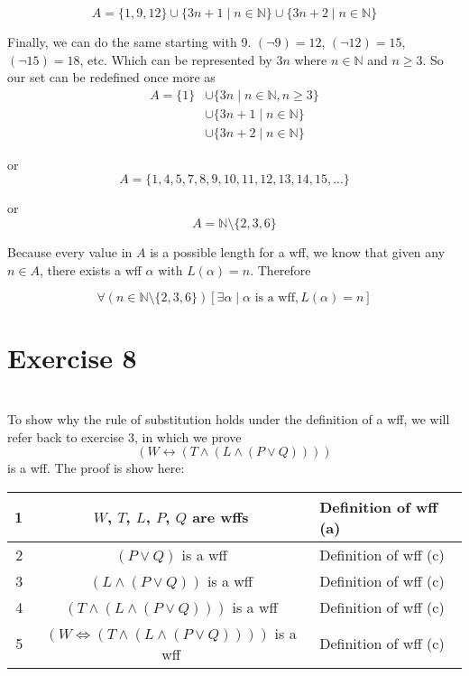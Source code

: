 \documentclass[12pt]{article}
\begin{document}
\[A = \{1, 9, 12\} \cup \{3n+1 \mid n \in \mathbb{N}\} \cup \{3n+2 \mid n \in \mathbb{N}\}\]

Finally, we can do the same starting with 9. $(\lnot 9) = 12$, $(\lnot 12) = 15$, $(\lnot 15) = 18$, etc. Which can be represented by $3n$ where $n \in \mathbb{N}$ and $n \geq 3$. So our set can be redefined once more as
\begin{align*}
    A = \{1\} & \cup \{3n \mid n \in \mathbb{N}, n \geq 3\}\\
            & \cup \{3n+1 \mid n \in \mathbb{N}\}\\
            & \cup \{3n+2 \mid n \in \mathbb{N}\}
\end{align*}

or
\[A = \{1, 4, 5, 7, 8, 9, 10, 11, 12, 13, 14, 15, ...\}\]

or
\[A = \mathbb{N} \setminus \{2, 3, 6\}\]

Because every value in $A$ is a possible length for a wff, we know that given any $n \in A$, there exists a wff $\alpha$ with $L(\alpha) = n$. Therefore

\[\forall(n \in \mathbb{N} \setminus \{2, 3, 6\})[\exists \alpha \mid \alpha \text{ is a wff}, L(\alpha) = n]\]


\newpage
\section*{Exercise 8}
\\

To show why the rule of substitution holds under the definition of a wff, we will refer back to exercise 3, in which we prove
\[(W \leftrightarrow (T \land ( L  \land (P \lor Q))))\]
is a wff. The proof is show here:

\begin{center}
    \begin{tabular}{|r|c|l|}
        \hline
        1 & $W$, $T$, $L$, $P$, $Q$ are wffs & Definition of wff (a)\\
        \hline
        2 & $(P \lor Q)$ is a wff & Definition of wff (c)\\
        \hline
        3 & $(L \land (P \lor Q))$ is a wff & Definition of wff (c)\\
        \hline
        4 & $(T \land (L \land (P \lor Q)))$ is a wff & Definition of wff (c)\\
        \hline
        5 & $(W \iff (T \land (L \land (P \lor Q))))$ is a wff & Definition of wff (c)\\
        \hline
    \end{tabular}
\end{center}
\end{document}
